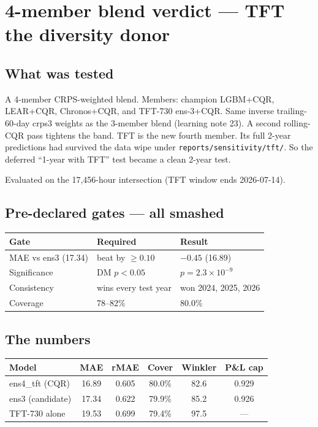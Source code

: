 \section{4-member blend verdict --- TFT the diversity donor}

\subsection{What was tested}

A 4-member CRPS-weighted blend. Members: champion LGBM+CQR,
LEAR+CQR, Chronos+CQR, and TFT-730 ens-3+CQR.
Same inverse trailing-60-day crps3 weights as the 3-member blend
(learning note 23). A second rolling-CQR pass tightens the band.
TFT is the new fourth member. Its full 2-year predictions had
survived the data wipe under \texttt{reports/sensitivity/tft/}.
So the deferred ``1-year with TFT'' test became a clean 2-year test.

Evaluated on the 17,456-hour intersection (TFT window ends 2026-07-14).

\subsection{Pre-declared gates --- all smashed}

\begin{tabular}{lll}
\hline
Gate & Required & Result \\
\hline
MAE vs ens3 (17.34) & beat by $\ge 0.10$ & $-0.45$ (16.89) \\
Significance & DM $p < 0.05$ & $p = 2.3\times10^{-9}$ \\
Consistency & wins every test year & won 2024, 2025, 2026 \\
Coverage & 78--82\% & 80.0\% \\
\hline
\end{tabular}

\subsection{The numbers}

\begin{tabular}{lccccc}
\hline
Model & MAE & rMAE & Cover & Winkler & P\&L cap \\
\hline
ens4\_tft (CQR) & 16.89 & 0.605 & 80.0\% & 82.6 & 0.929 \\
ens3 (candidate) & 17.34 & 0.622 & 79.9\% & 85.2 & 0.926 \\
TFT-730 alone & 19.53 & 0.699 & 79.4\% & 97.5 & --- \\
\hline
\end{tabular}


